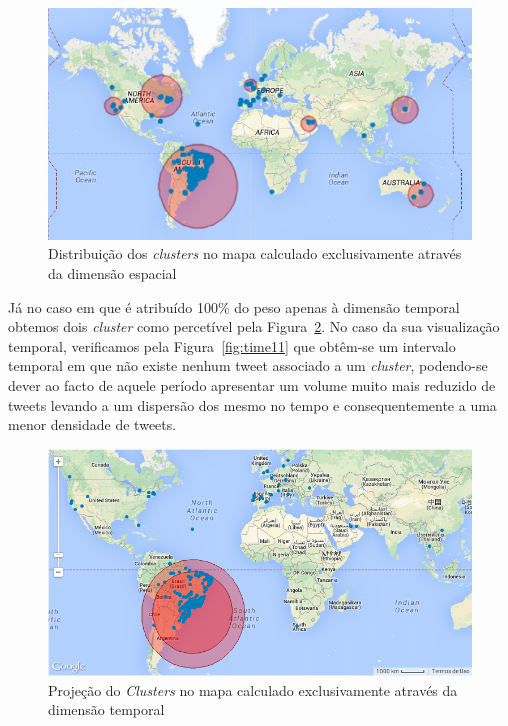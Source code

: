 \begin{figure}
\centering
\includegraphics[width=0.8\linewidth]{./figures/olhopassarinho/map31}
\caption{Distribuição dos \textit{clusters} no mapa calculado exclusivamente através da dimensão espacial}
\label{fig:map31}
\end{figure}

Já no caso em que é atribuído 100\% do peso apenas à dimensão temporal obtemos dois \textit{cluster} como percetível pela Figura~\ref{fig:map32}. No caso da sua visualização temporal, verificamos pela Figura~\ref{fig:time11} que obtêm-se um intervalo temporal em que não existe nenhum tweet associado a um \textit{cluster}, podendo-se dever ao facto de aquele período apresentar um volume muito mais reduzido de tweets levando a um dispersão dos mesmo no tempo e consequentemente a uma menor densidade de tweets.

\begin{figure}[!h]
\centering
\includegraphics[width=0.9\linewidth]{./figures/olhopassarinho/map32}
\caption{Projeção do \textit{Clusters} no mapa calculado exclusivamente através da dimensão temporal}
\label{fig:map32}
\end{figure}

